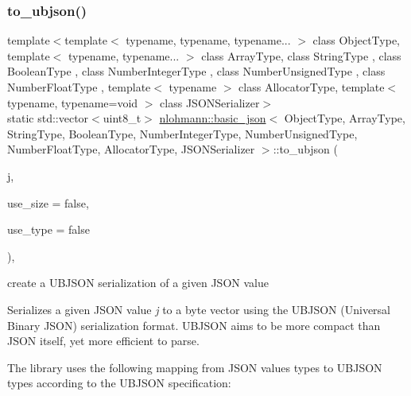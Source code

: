 \subsubsection{\texorpdfstring{to\+\_\+ubjson()}{to\_ubjson()}\hspace{0.1cm}{\footnotesize\ttfamily [1/3]}}
{\footnotesize\ttfamily template$<$template$<$ typename, typename, typename... $>$ class Object\+Type, template$<$ typename, typename... $>$ class Array\+Type, class String\+Type , class Boolean\+Type , class Number\+Integer\+Type , class Number\+Unsigned\+Type , class Number\+Float\+Type , template$<$ typename $>$ class Allocator\+Type, template$<$ typename, typename=void $>$ class J\+S\+O\+N\+Serializer$>$ \\
static std\+::vector$<$uint8\+\_\+t$>$ \hyperlink{classnlohmann_1_1basic__json}{nlohmann\+::basic\+\_\+json}$<$ Object\+Type, Array\+Type, String\+Type, Boolean\+Type, Number\+Integer\+Type, Number\+Unsigned\+Type, Number\+Float\+Type, Allocator\+Type, J\+S\+O\+N\+Serializer $>$\+::to\+\_\+ubjson (\begin{DoxyParamCaption}\item[{const \hyperlink{classnlohmann_1_1basic__json}{basic\+\_\+json}$<$ Object\+Type, Array\+Type, String\+Type, Boolean\+Type, Number\+Integer\+Type, Number\+Unsigned\+Type, Number\+Float\+Type, Allocator\+Type, J\+S\+O\+N\+Serializer $>$ \&}]{j,  }\item[{const bool}]{use\+\_\+size = {\ttfamily false},  }\item[{const bool}]{use\+\_\+type = {\ttfamily false} }\end{DoxyParamCaption})\hspace{0.3cm}{\ttfamily [inline]}, {\ttfamily [static]}}



create a U\+B\+J\+S\+ON serialization of a given J\+S\+ON value 

Serializes a given J\+S\+ON value {\itshape j} to a byte vector using the U\+B\+J\+S\+ON (Universal Binary J\+S\+ON) serialization format. U\+B\+J\+S\+ON aims to be more compact than J\+S\+ON itself, yet more efficient to parse.

The library uses the following mapping from J\+S\+ON values types to U\+B\+J\+S\+ON types according to the U\+B\+J\+S\+ON specification\+:

